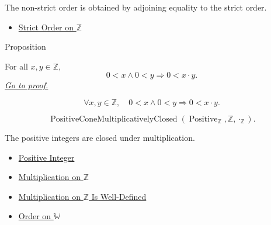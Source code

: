 \begin{remark*}[Interpretation]
The non-strict order is obtained by adjoining equality to the strict order.
\end{remark*}

\begin{dependencies}
\begin{itemize}
  \item \hyperref[def:strict-order-on-z]{Strict Order on $\mathbb{Z}$}
\end{itemize}
\end{dependencies}

\begin{propositionbox}{Proposition}
\begin{proposition}
\label{prop:product-of-positives-is-positive}
For all $x,y\in\mathbb{Z}$,
\[
0<x\land 0<y \Longrightarrow 0<x\cdot y.
\]
\hyperref[prf:product-of-positives-is-positive]{\textit{Go to proof.}}
\end{proposition}
\end{propositionbox}

\begin{remark*}
\[
\forall x,y\in\mathbb{Z},\quad
0<x\land 0<y \Longrightarrow 0<x\cdot y.
\]
\end{remark*}

\begin{remark*}
\[
\operatorname{PositiveConeMultiplicativelyClosed}(\operatorname{Positive}_{\mathbb{Z}},\mathbb{Z},\cdot_{\mathbb{Z}}).
\]
\end{remark*}

\begin{remark*}[Interpretation]
The positive integers are closed under multiplication.
\end{remark*}

\begin{dependencies}
\begin{itemize}
  \item \hyperref[def:positive-integer]{Positive Integer}
  \item \hyperref[def:multiplication-on-z-classes]{Multiplication on $\mathbb{Z}$}
  \item \hyperref[thm:multiplication-on-z-well-defined]{Multiplication on $\mathbb{Z}$ Is Well-Defined}
  \item \hyperref[def:order-on-w]{Order on $\mathbb{W}$}
\end{itemize}
\end{dependencies}

